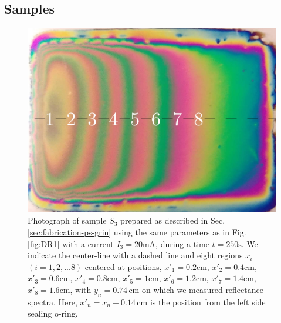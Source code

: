 \documentclass[review,sort&compress]{cas-sc}
\begin{document}
\subsection{Samples }
\label{sec:ps-grin-single}
\begin{figure}
 \centering
 \includegraphics[width=\textwidth]{fig6}
  \caption{ Photograph of sample $S_3$ prepared as described in
    Sec. \ref{sec:fabrication-ps-grin} using the same parameters as
    in Fig. \ref{fig:DR1} with a current $ I_3=20 \text{mA}$,
    during a time $t=250\text{s}$. We indicate the center-line with a
    dashed line and eight regions $x_i$
    $(i=1, 2,...8)$ centered at positions,
    $x'_1=0.2\text{cm}$,  $x'_2=0.4\text{cm}$, $x'_3=0.6\text{cm}$,
    $x'_4=0.8\text{cm}$, $x'_5=1\text{cm}$, $x'_6=1.2\text{cm}$,
    $x'_7=1.4\text{cm}$, $x'_8=1.6\text{cm}$, with $y_n=0.74\,\text{cm}$
    on which we measured reflectance spectra. Here,
    $x'_n=x_n+0.14\,\text{cm}$ is the position from the left side sealing o-ring.}
  \label{fig:SI3}
\end{figure}
\end{document}
